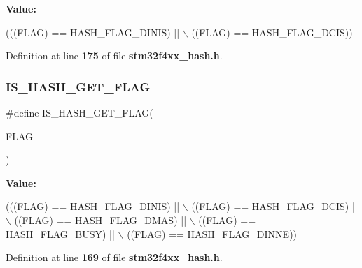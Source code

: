{\bfseries Value\+:}
\begin{DoxyCode}
(((FLAG) == HASH_FLAG_DINIS) || \(\backslash\)
                                 ((FLAG) == HASH_FLAG_DCIS))
\end{DoxyCode}


Definition at line \textbf{ 175} of file \textbf{ stm32f4xx\+\_\+hash.\+h}.

\mbox{\label{group__HASH__flags__definition_gad2b0be65f07e279eaa3a1069aa434936}} 
\subsubsection{I\+S\+\_\+\+H\+A\+S\+H\+\_\+\+G\+E\+T\+\_\+\+F\+L\+AG}
{\footnotesize\ttfamily \#define I\+S\+\_\+\+H\+A\+S\+H\+\_\+\+G\+E\+T\+\_\+\+F\+L\+AG(\begin{DoxyParamCaption}\item[{}]{F\+L\+AG }\end{DoxyParamCaption})}

{\bfseries Value\+:}
\begin{DoxyCode}
(((FLAG) == HASH_FLAG_DINIS) || \(\backslash\)
                                ((FLAG) == HASH_FLAG_DCIS)  || \(\backslash\)
                                ((FLAG) == HASH_FLAG_DMAS)  || \(\backslash\)
                                ((FLAG) == HASH_FLAG_BUSY)  || \(\backslash\)
                                ((FLAG) == HASH_FLAG_DINNE))
\end{DoxyCode}


Definition at line \textbf{ 169} of file \textbf{ stm32f4xx\+\_\+hash.\+h}.

